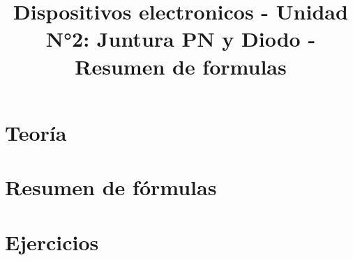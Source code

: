 \documentclass{article}
\title{Dispositivos electronicos - Unidad N°2: Juntura PN y Diodo - Resumen de formulas}
\begin{document}
	
	

	\tableofcontents
	
	\newpage
	
	\section{Teoría}
	
	
	\newpage

	\section{Resumen de fórmulas}
	
	
	\newpage
	
	\section{Ejercicios}
	
	
	\newpage
	
\end{document}
